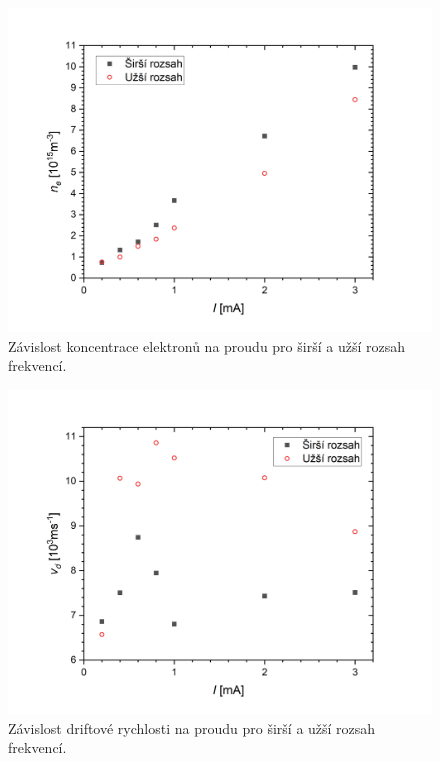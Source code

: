 \documentclass[a4paper,12pt]{article}
\begin{document}
\begin{figure}[h]
	\centering
	\includegraphics[width=0.9\linewidth]{koncnai.png}
	\caption{Závislost koncentrace elektronů na proudu pro širší a užší rozsah 
	frekvencí.}
	\label{koncnai}
\end{figure}

\begin{figure}[h]
	\centering
	\includegraphics[width=0.9\linewidth]{vd.png}
	\caption{Závislost driftové rychlosti na proudu pro širší a užší rozsah 
		frekvencí.}
	\label{vd}
\end{figure}

\clearpage
\end{document}
